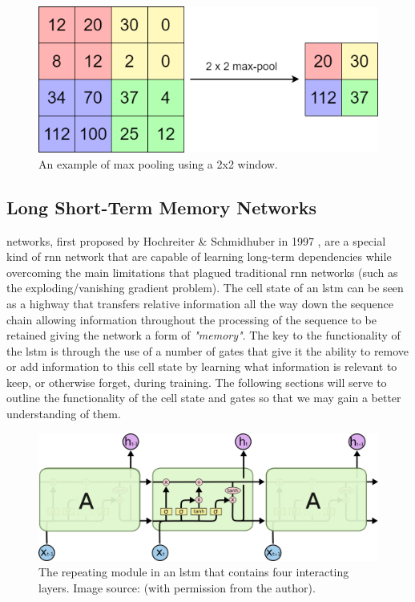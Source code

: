 \begin{figure}[hbt!]
    \centering
    \includegraphics[width=\textwidth]{Images/Chapter 3/CNN/Max-Pooling-Illustration.png}
    \caption{An example of max pooling using a 2x2 window.}
    \label{fig:Max-Pooling-Illustration}
\end{figure}

\clearpage

\subsection{Long Short-Term Memory Networks}
\label{subsec:Background-Information:Long-Short-Term-Memory-Networks}
 networks, first proposed by Hochreiter \& Schmidhuber in 1997 \cite{Hochreiter}, are a special kind of \gls{rnn} network that are capable of learning long-term dependencies while overcoming the main limitations that plagued traditional \gls{rnn} networks (such as the exploding/vanishing gradient problem). The cell state of an \gls{lstm} can be seen as a highway that transfers relative information all the way down the sequence chain allowing information throughout the processing of the sequence to be retained giving the network a form of \textit{"memory"}. The key to the functionality of the \gls{lstm} is through the use of a number of gates that give it the ability to remove or add information to this cell state by learning what information is relevant to keep, or otherwise forget, during training. The following sections will serve to outline the functionality of the cell state and gates so that we may gain a better understanding of them.

\begin{figure}[hbt!]
    \centering
    \includegraphics[width=\textwidth]{Images/Chapter 3/LSTM/LSTM-Chain-Illustration.png}
    \caption{The repeating module in an \gls{lstm} that contains four interacting layers. Image source: \cite{Colah}  (with permission from the author).}
    \label{fig:LSTM-Chain-Illustration}
\end{figure}

